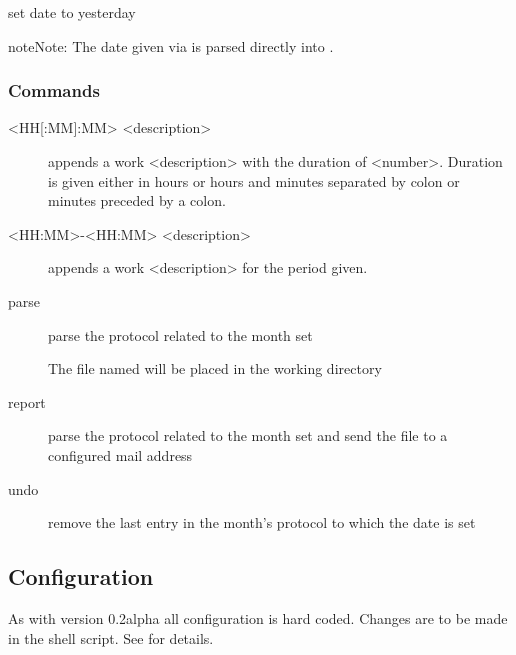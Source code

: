 \documentclass[letterpaper,10pt,english]{sphinxmanual}
\begin{document}
set date to yesterday

\begin{sphinxadmonition}{note}{Note:}
The date given via {\hyperref[\detokenize{usermanual:cmdoption-date}]{}} is parsed directly into .
\end{sphinxadmonition}


\subsubsection{Commands}
\label{\detokenize{usermanual:commands}}\begin{description}
\item[{\textless{}HH{[}:MM{]}\textbar{}:MM\textgreater{} \textless{}description\textgreater{}}] \leavevmode
appends a work \textless{}description\textgreater{} with the duration of \textless{}number\textgreater{}. Duration is given either in hours or
hours and minutes separated by colon or minutes preceded by a colon.

\item[{\textless{}HH:MM\textgreater{}-\textless{}HH:MM\textgreater{} \textless{}description\textgreater{}}] \leavevmode
appends a work \textless{}description\textgreater{} for the period given.

\item[{parse}] \leavevmode
parse the protocol related to the month set

The file named  will be placed in the working directory

\item[{report}] \leavevmode
parse the protocol related to the month set and send the  file to a configured mail address

\item[{undo}] \leavevmode
remove the last entry in the month’s protocol to which the date is set

\end{description}


\subsection{Configuration}
\label{\detokenize{usermanual:configuration}}
As with version 0.2alpha all configuration is hard coded. Changes are to be made in the shell script. See {\hyperref[\detokenize{devmanual::doc}]{}} for details.
\end{document}

